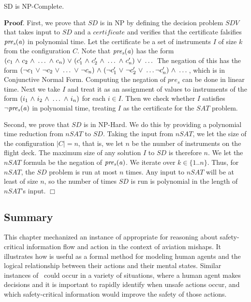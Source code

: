 \begin{theorem}[NP]
	SD is NP-Complete.
\end{theorem}
$\mathbf{Proof.}$ First, we prove that $SD$ is in NP by defining the decision problem $\mathit{SDV}$ that takes input to $\mathit{SD}$ and a $\mathit{certificate}$ and verifies that the certificate falsifies $\mathit{pre_s}(\mathit{a})$ in polynomial time. Let the certificate be a set of instruments $I$ of size $k$ from the configuration $C$. Note that $\mathit{pre_s}(\mathit{a})$ has the form $(c_1 {\ \wedge \ } c_2 {\ \wedge \ } \dots {\ \wedge \ } c_n) {\ \vee \ } (c_1' {\ \wedge \ } c_2' {\ \wedge \ } \dots \\ {\ \wedge \ } c_n') {\ \vee \ } \dots$ The negation of this has the form $({\neg} c_1 {\ \vee \ } {\neg} c_2 {\ \vee \ } \dots {\ \vee \ } {\neg} c_n) {\ \wedge \ } ({\neg} c_1' {\ \vee \ } {\neg} c_2' \\ {\ \vee \ } \dots {\neg} c_n') {\ \wedge \ } \dots$, which is in Conjunctive Normal Form. Computing the negation of $\mathit{pre_s}$ can be done in linear time. Next we take $I$ and treat it as an assignment of values to instruments of the form $(i_1 {\ \wedge \ } i_2 {\ \wedge \ } \dots {\ \wedge \ } i_n)$ for each $i \in I$. Then we check whether $I$ satisfies ${\neg} \mathit{pre_s}(\mathit{a})$ in polynomial time, treating $I$ as the certificate for the $SAT$ problem.

Second, we prove that $SD$ is in NP-Hard. We do this by providing a polynomial time reduction from $nSAT$ to $SD$. Taking the input from $nSAT$, we let the size of the configuration $|C| = n$, that is, we let $n$ be the number of instruments on the flight deck. The maximum size of any solution $I$ to $SD$ is therefore $n$. We let the $nSAT$ formula be the negation of $\mathit{pre_s}(\mathit{a})$. We iterate over $k \in \{1..n\}$. Thus, for $nSAT$, the $SD$ problem is run at most $n$ times. Any input to $nSAT$ will be at least of size $n$, so the number of times $SD$ is run is polynomial in the length of $nSAT$'s input. $\Box$

\subsection{Summary}
This chapter mechanized an instance of \DASL appropriate for reasoning about safety-critical information flow and action in the context of aviation mishaps. It illustrates how \DASL is useful as a formal method for modeling human agents and the logical relationship between their actions and their mental states. Similar instances of \DASL\ could occur in a variety of situations, where a human agent makes decisions and it is important to rapidly identify when unsafe actions occur, and which safety-critical information would improve the safety of those actions. 


